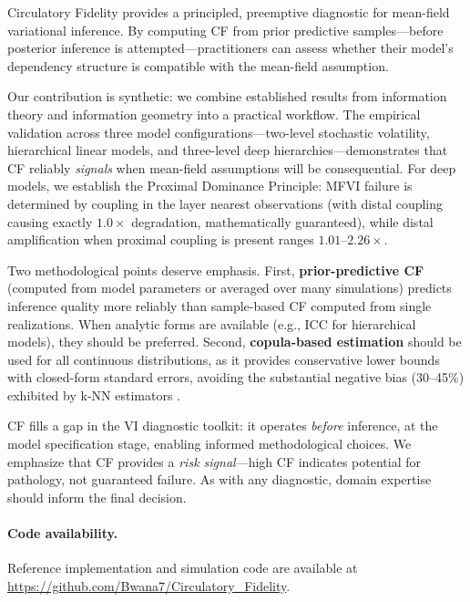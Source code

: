 \documentclass[10pt]{article} %
\theoremstyle{plain}
\theoremstyle{definition}
\begin{document}
Circulatory Fidelity provides a principled, preemptive diagnostic for mean-field variational inference. By computing CF from prior predictive samples---before posterior inference is attempted---practitioners can assess whether their model's dependency structure is compatible with the mean-field assumption.

Our contribution is synthetic: we combine established results from information theory \citep{kvalseth1987entropy,vinh2010information} and information geometry \citep{amari2016information} into a practical workflow. The empirical validation across three model configurations---two-level stochastic volatility, hierarchical linear models, and three-level deep hierarchies---demonstrates that CF reliably \emph{signals} when mean-field assumptions will be consequential. For deep models, we establish the Proximal Dominance Principle: MFVI failure is determined by coupling in the layer nearest observations (with distal coupling causing exactly $1.0\times$ degradation, mathematically guaranteed), while distal amplification when proximal coupling is present ranges $1.01$--$2.26\times$.

Two methodological points deserve emphasis. First, \textbf{prior-predictive CF} (computed from model parameters or averaged over many simulations) predicts inference quality more reliably than sample-based CF computed from single realizations. When analytic forms are available (e.g., ICC for hierarchical models), they should be preferred. Second, \textbf{copula-based estimation} should be used for all continuous distributions, as it provides conservative lower bounds with closed-form standard errors, avoiding the substantial negative bias (30--45\%) exhibited by k-NN estimators \citep{vandenberg2025linfoot}.

CF fills a gap in the VI diagnostic toolkit: it operates \emph{before} inference, at the model specification stage, enabling informed methodological choices. We emphasize that CF provides a \emph{risk signal}---high CF indicates potential for pathology, not guaranteed failure. As with any diagnostic, domain expertise should inform the final decision.

\paragraph{Code availability.} Reference implementation and simulation code are available at \url{https://github.com/Bwana7/Circulatory_Fidelity}.


\end{document}
